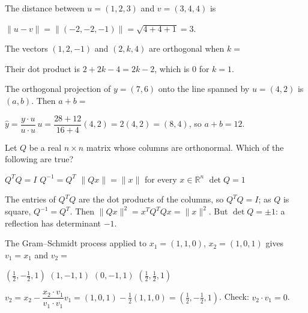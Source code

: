 
\begin{question}[id=orth-1]
The distance between $u = (1, 2, 3)$ and $v = (3, 4, 4)$ is
\begin{solution}
$\|u - v\| = \|(-2, -2, -1)\| = \sqrt{4 + 4 + 1} = 3$.
\end{solution}
\end{question}

\begin{question}[id=orth-2]
The vectors $(1, 2, -1)$ and $(2, k, 4)$ are orthogonal when $k =$
\begin{options}
\end{options}
\begin{solution}
Their dot product is $2 + 2k - 4 = 2k - 2$, which is 0 for $k = 1$.
\end{solution}
\end{question}

\begin{question}[id=orth-3, marks=2]
The orthogonal projection of $y = (7, 6)$ onto the line spanned by $u = (4, 2)$ is $(a, b)$. Then $a + b =$
\begin{solution}
$\hat{y} = \dfrac{y \cdot u}{u \cdot u}\, u = \dfrac{28 + 12}{16 + 4}(4, 2) = 2(4, 2) = (8, 4)$, so $a + b = 12$.
\end{solution}
\end{question}

\begin{question}[id=orth-4, type=msq, marks=2]
Let $Q$ be a real $n \times n$ matrix whose columns are orthonormal. Which of the following are true?
\begin{options}
  \correct $Q^T Q = I$
  \correct $Q^{-1} = Q^T$
  \correct $\|Qx\| = \|x\|$ for every $x \in \mathbb{R}^n$
  \option $\det Q = 1$
\end{options}
\begin{solution}
The entries of $Q^TQ$ are the dot products of the columns, so $Q^TQ = I$; as $Q$ is square, $Q^{-1} = Q^T$. Then $\|Qx\|^2 = x^TQ^TQx = \|x\|^2$. But $\det Q = \pm 1$: a reflection has determinant $-1$.
\end{solution}
\end{question}

\begin{question}[id=orth-5, marks=2]
The Gram--Schmidt process applied to $x_1 = (1, 1, 0)$, $x_2 = (1, 0, 1)$ gives $v_1 = x_1$ and $v_2 =$
\begin{options}
  \correct $(\tfrac{1}{2}, -\tfrac{1}{2}, 1)$
  \option $(1, -1, 1)$
  \option $(0, -1, 1)$
  \option $(\tfrac{1}{2}, \tfrac{1}{2}, 1)$
\end{options}
\begin{solution}
$v_2 = x_2 - \dfrac{x_2 \cdot v_1}{v_1 \cdot v_1} v_1 = (1, 0, 1) - \tfrac{1}{2}(1, 1, 0) = (\tfrac{1}{2}, -\tfrac{1}{2}, 1)$. Check: $v_2 \cdot v_1 = 0$.
\end{solution}
\end{question}

